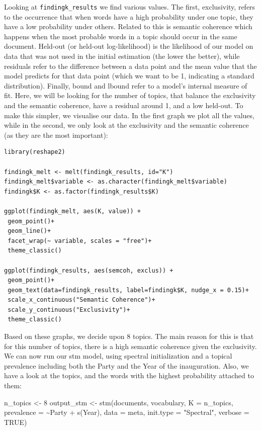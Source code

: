 \documentclass[
]{article}
\newenvironment{Shaded}{\begin{snugshade}}{\end{snugshade}}
\newcommand{\AttributeTok}[1]{\textcolor[rgb]{0.77,0.63,0.00}{#1}}
\newcommand{\ConstantTok}[1]{\textcolor[rgb]{0.00,0.00,0.00}{#1}}
\newcommand{\DecValTok}[1]{\textcolor[rgb]{0.00,0.00,0.81}{#1}}
\newcommand{\FunctionTok}[1]{\textcolor[rgb]{0.00,0.00,0.00}{#1}}
\newcommand{\NormalTok}[1]{#1}
\newcommand{\OtherTok}[1]{\textcolor[rgb]{0.56,0.35,0.01}{#1}}
\newcommand{\SpecialCharTok}[1]{\textcolor[rgb]{0.00,0.00,0.00}{#1}}
\newcommand{\StringTok}[1]{\textcolor[rgb]{0.31,0.60,0.02}{#1}}
\begin{document}
Looking at \texttt{findingk\_results} we find various values. The first, exclusivity, refers to the occurrence that when words have a high probability under one topic, they have a low probability under others. Related to this is semantic coherence which happens when the most probable words in a topic should occur in the same document. Held-out (or held-out log-likelihood) is the likelihood of our model on data that was not used in the initial estimation (the lower the better), while residuals refer to the difference between a data point and the mean value that the model predicts for that data point (which we want to be 1, indicating a standard distribution). Finally, bound and lbound refer to a model's internal measure of fit. Here, we will be looking for the number of topics, that balance the exclusivity and the semantic coherence, have a residual around 1, and a low held-out. To make this simpler, we visualise our data. In the first graph we plot all the values, while in the second, we only look at the exclusivity and the semantic coherence (as they are the most important):

\begin{verbatim}
library(reshape2)

findingk_melt <- melt(findingk_results, id="K") 
findingk_melt$variable <- as.character(findingk_melt$variable)
findingk$K <- as.factor(findingk_results$K)

ggplot(findingk_melt, aes(K, value)) +
 geom_point()+
 geom_line()+
 facet_wrap(~ variable, scales = "free")+
 theme_classic()

ggplot(findingk_results, aes(semcoh, exclus)) +
 geom_point()+
 geom_text(data=findingk_results, label=findingk$K, nudge_x = 0.15)+
 scale_x_continuous("Semantic Coherence")+
 scale_y_continuous("Exclusivity")+
 theme_classic()
\end{verbatim}

Based on these graphs, we decide upon 8 topics. The main reason for this is that for this number of topics, there is a high semantic coherence given the exclusivity. We can now run our stm model, using spectral initialization and a topical prevalence including both the Party and the Year of the inauguration. Also, we have a look at the topics, and the words with the highest probability attached to them:

\begin{Shaded}
\begin{Highlighting}[]
\NormalTok{n\_topics }\OtherTok{\textless{}{-}} \DecValTok{8}
\NormalTok{output\_stm }\OtherTok{\textless{}{-}} \FunctionTok{stm}\NormalTok{(documents, vocabulary, }\AttributeTok{K =}\NormalTok{ n\_topics, }\AttributeTok{prevalence =} \SpecialCharTok{\textasciitilde{}}\NormalTok{Party }\SpecialCharTok{+}
    \FunctionTok{s}\NormalTok{(Year), }\AttributeTok{data =}\NormalTok{ meta, }\AttributeTok{init.type =} \StringTok{"Spectral"}\NormalTok{, }\AttributeTok{verbose =} \ConstantTok{TRUE}\NormalTok{)}
\end{Highlighting}
\end{Shaded}
\end{document}
